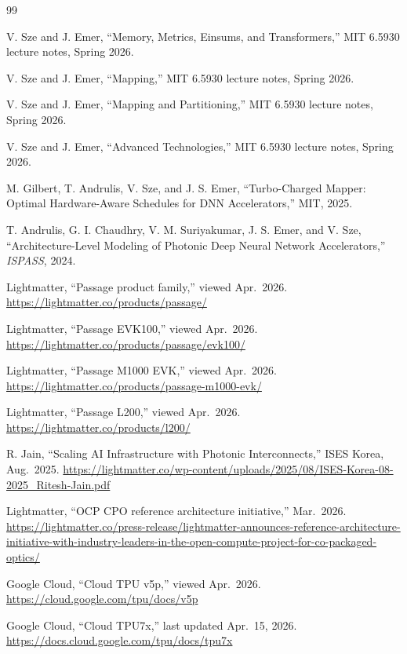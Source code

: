 \documentclass[conference]{IEEEtran}
\begin{document}
\begin{thebibliography}{99}
\footnotesize

 V. Sze and J. Emer, ``Memory, Metrics,
Einsums, and Transformers,'' MIT 6.5930 lecture notes,
Spring 2026.

 V. Sze and J. Emer, ``Mapping,''
MIT 6.5930 lecture notes, Spring 2026.

 V. Sze and J. Emer, ``Mapping and
Partitioning,'' MIT 6.5930 lecture notes, Spring 2026.

 V. Sze and J. Emer, ``Advanced
Technologies,'' MIT 6.5930 lecture notes, Spring 2026.

 M. Gilbert, T. Andrulis, V. Sze, and J. S. Emer,
``Turbo-Charged Mapper: Optimal Hardware-Aware Schedules for
DNN Accelerators,'' MIT, 2025.

 T. Andrulis, G. I. Chaudhry, V. M.
Suriyakumar, J. S. Emer, and V. Sze, ``Architecture-Level
Modeling of Photonic Deep Neural Network Accelerators,''
\emph{ISPASS}, 2024.

 Lightmatter, ``Passage product
family,'' viewed Apr.\ 2026.
\url{https://lightmatter.co/products/passage/}

 Lightmatter, ``Passage EVK100,''
viewed Apr.\ 2026.
\url{https://lightmatter.co/products/passage/evk100/}

 Lightmatter, ``Passage M1000 EVK,''
viewed Apr.\ 2026.
\url{https://lightmatter.co/products/passage-m1000-evk/}

 Lightmatter, ``Passage L200,''
viewed Apr.\ 2026.
\url{https://lightmatter.co/products/l200/}

 R. Jain, ``Scaling AI Infrastructure
with Photonic Interconnects,'' ISES Korea, Aug.\ 2025.
\url{https://lightmatter.co/wp-content/uploads/2025/08/ISES-Korea-08-2025_Ritesh-Jain.pdf}

 Lightmatter, ``OCP CPO reference
architecture initiative,'' Mar.\ 2026.
\url{https://lightmatter.co/press-release/lightmatter-announces-reference-architecture-initiative-with-industry-leaders-in-the-open-compute-project-for-co-packaged-optics/}

 Google Cloud, ``Cloud TPU v5p,'' viewed
Apr.\ 2026. \url{https://cloud.google.com/tpu/docs/v5p}

 Google Cloud, ``Cloud TPU7x,'' last updated
Apr.\ 15, 2026.
\url{https://docs.cloud.google.com/tpu/docs/tpu7x}


\end{thebibliography}
\end{document}
